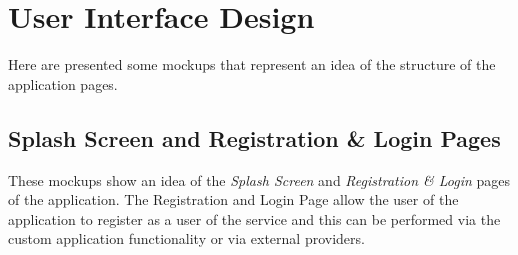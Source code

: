 \chapter{User Interface Design} \label{chap4}
Here are presented some mockups that represent an idea of the structure of the application pages.

\clearpage
\section{Splash Screen and Registration \& Login Pages}
These mockups show an idea of the \textit{Splash Screen} and \textit{Registration \& Login} pages of the application. The Registration and Login Page allow the user of the application to register as a user of the service and this can be performed via the custom application functionality or via external providers.\\

